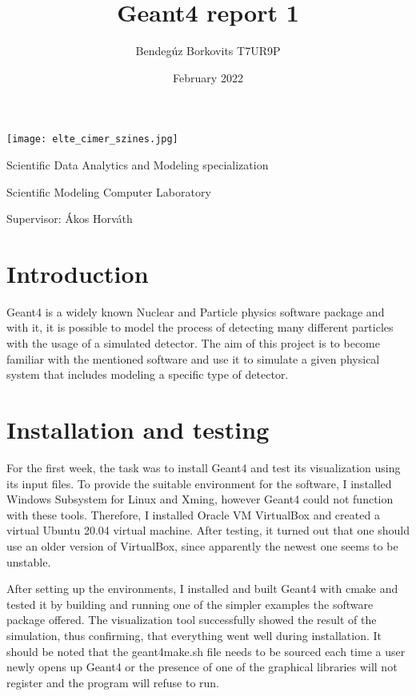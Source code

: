 \documentclass[a4paper,12pt]{extarticle}
\title{Geant4 report 1}
\author{Bendegúz Borkovits T7UR9P}
\date{February 2022}
\begin{document}
\onehalfspacing

\maketitle

\begin{center}

\texttt{[image: elte\_cimer\_szines.jpg]}

\vspace{2 cm}
Scientific Data Analytics and Modeling specialization

Scientific Modeling Computer Laboratory

Supervisor: Ákos Horváth


\end{center}

\section{Introduction}
Geant4 is a widely known Nuclear and Particle physics software package and with it, it is possible to model the process of detecting many different particles with the usage of a simulated detector. The aim of this project is to become familiar with the mentioned software and use it to simulate a given physical system that includes modeling a specific type of detector.

\section{Installation and testing}

For the first week, the task was to install Geant4 and test its visualization using its input files. To provide the suitable environment for the software, I installed Windows Subsystem for Linux and Xming, however Geant4 could not function with these tools. Therefore, I installed Oracle VM VirtualBox and created a virtual Ubuntu 20.04 virtual machine. After testing, it turned out that one should use an older version of VirtualBox, since apparently the newest one seems to be unstable.

After setting up the environments, I installed and built Geant4 with cmake and tested it by building and running one of the simpler examples the software package offered. The visualization tool successfully showed the result of the simulation, thus confirming, that everything went well during installation. It should be noted that the geant4make.sh file needs to be sourced each time a user newly opens up Geant4 or the presence of one of the graphical libraries will not register and the program will refuse to run.
\end{document}
